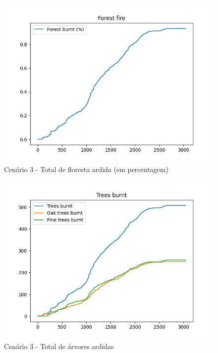 \begin{figure}[H]
    \centering
    \includegraphics[width=\textwidth]{src/runs/scenario3/forest_fire.png}
    \caption{Cenário 3 - Total de floresta ardida (em percentagem)}
    \label{fig:S3ForestBurnt}
\end{figure}

\begin{figure}[H]
    \centering
    \includegraphics[width=\textwidth]{src/runs/scenario3/trees_burnt.png}
    \caption{Cenário 3 - Total de árvores ardidas}
    \label{fig:S3TreesBurnt}
\end{figure}

